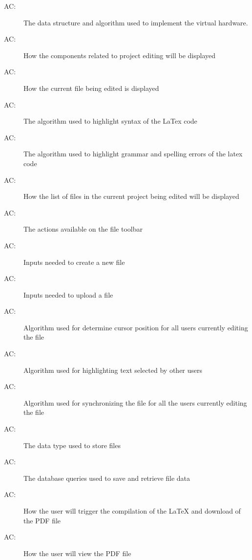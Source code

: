 \documentclass[12pt, titlepage]{article}
\newcounter{acnum}
\newcommand{\actheacnum}{AC\theacnum}
\begin{document}
	\begin{description}
		
		\item[ \actheacnum \label{ac1}:] The data structure and algorithm used to implement the virtual hardware.
		\item[ \actheacnum \label{ac2}:]  How the components related to project editing will be displayed
		\item[ \actheacnum \label{ac3}:]  How the current file being edited is displayed
		\item[ \actheacnum \label{ac4}:]  The algorithm used to highlight syntax of the LaTex code
		\item[ \actheacnum \label{ac5}:]  The algorithm used to highlight grammar and spelling errors of the latex code
		\item[ \actheacnum \label{ac6}:]  How the list of files in the current project being edited will be displayed
		\item[ \actheacnum \label{ac7}:]  The actions available on the file toolbar
		\item[ \actheacnum \label{ac8}:]  Inputs needed to create a new file
		\item[ \actheacnum \label{ac9}:]  Inputs needed to upload a file
		\item[ \actheacnum \label{ac10}:]  Algorithm used for determine cursor position for all users currently editing the file
		\item[ \actheacnum \label{ac11}:]  Algorithm used for highlighting text selected by other users
		\item[ \actheacnum \label{ac12}:]  Algorithm used for synchronizing the file for all the users currently editing the file
		\item[ \actheacnum \label{ac13}:]  The data type used to store files
		\item[ \actheacnum \label{ac14}:]  The database queries used to save and retrieve file data
		\item[ \actheacnum \label{ac15}:]  How the user will trigger the compilation of the LaTeX and download of the PDF file
		\item[ \actheacnum \label{ac16}:]  How the user will view the PDF file

\end{description}
\end{document}
